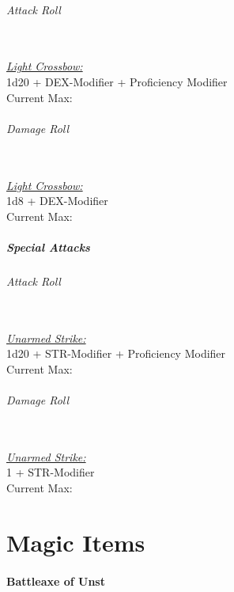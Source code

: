 \documentclass[letterpaper,openany,oneside,twocolumn]{book}
\begin{document}
\paragraph*{Attack Roll}\hfill\\
\underline{\textit{Light Crossbow:}}\\
1d20 + DEX-Modifier + Proficiency Modifier\\
\indent Current Max: 
\paragraph*{Damage Roll}\hfill\\
\underline{\textit{Light Crossbow:}}\\
1d8 + DEX-Modifier\\
\indent Current Max: 
\subsubsection*{Special Attacks}
\paragraph*{Attack Roll}\hfill\\
\underline{\textit{Unarmed Strike:}}\\
1d20 + STR-Modifier + Proficiency Modifier\\
\indent Current Max: 
\paragraph*{Damage Roll}\hfill\\
\underline{\textit{Unarmed Strike:}}\\
1 + STR-Modifier\\
\indent Current Max: 

\part*{Magic Items}

\subsection*{Battleaxe of Unst}
\end{document}
